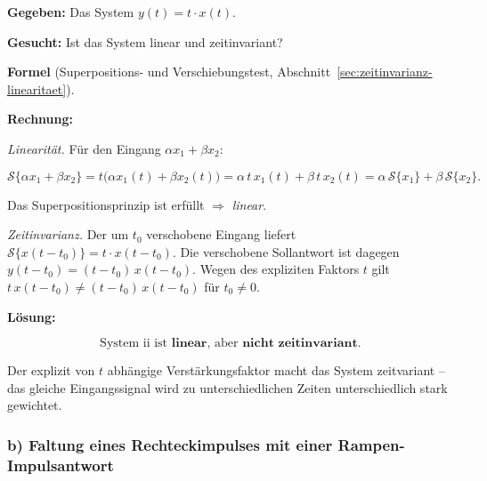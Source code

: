 \begin{beispiel}

\textbf{Gegeben:} Das System $y(t) = t \cdot x(t)$.

\textbf{Gesucht:} Ist das System linear und zeitinvariant?

\textbf{Formel} (Superpositions- und Verschiebungstest,
Abschnitt~\ref{sec:zeitinvarianz-linearitaet}).

\textbf{Rechnung:}

\emph{Linearität.} Für den Eingang $\alpha x_1 + \beta x_2$:

$$
\mathcal{S}\{\alpha x_1 + \beta x_2\} = t\big(\alpha x_1(t) + \beta x_2(t)\big)
= \alpha\, t\, x_1(t) + \beta\, t\, x_2(t)
= \alpha\,\mathcal{S}\{x_1\} + \beta\,\mathcal{S}\{x_2\}.
$$

Das Superpositionsprinzip ist erfüllt $\Rightarrow$ \emph{linear}.

\emph{Zeitinvarianz.} Der um $t_0$ verschobene Eingang liefert
$\mathcal{S}\{x(t - t_0)\} = t\cdot x(t - t_0)$. Die verschobene Sollantwort ist
dagegen $y(t - t_0) = (t - t_0)\, x(t - t_0)$. Wegen des expliziten Faktors $t$
gilt $t\, x(t - t_0) \neq (t - t_0)\, x(t - t_0)$ für $t_0 \neq 0$.

\textbf{Lösung:}

$$
\boxed{\;\text{System ii ist } \textbf{linear}, \text{ aber } \textbf{nicht zeitinvariant.}\;}
$$

Der explizit von $t$ abhängige Verstärkungsfaktor macht das System
zeitvariant -- das gleiche Eingangssignal wird zu unterschiedlichen Zeiten
unterschiedlich stark gewichtet.

\end{beispiel}

\subsubsection*{b) Faltung eines Rechteckimpulses mit einer Rampen-Impulsantwort}

